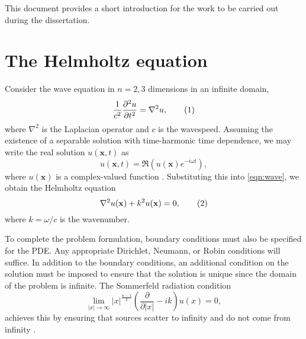 \iffalse Brief outline of the chapter below

Background:
	What is HH equation?
	What does it model?
	How is it derived?
	Boundary conditions
	- 	Sommerfield radiation condition
	
Finite element method:
	Discretisation of HH
	Discretisation of infinite domains
		D,N,radiation
	ABC, DtN, PML

Linear solvers:
	Iterative and direct
	Krylov methods
	Preconditioners
	How does this relate to Poisson and HH?
	- 	Small wavenumbers good convergence

Project direction:
	Where are we going? What to do...?
	Multigrid in non-cartesian coordinates
	Fourier decompostion of HH
	Explore implementation of PMLs
\fi


This document provides a short introduction for the work to be carried out during the dissertation.

\section{The Helmholtz equation}

Consider the wave equation in $n=2,3$ dimensions in an infinite domain,
\[
	\frac{1}{c^2} \frac{\partial^2 u}{\partial t^2} = 
		\nabla^2 u,\addtag \label{eqn:wave}
\]
where $\nabla^2$ is the Laplacian operator and $c$ is the wavespeed.
Assuming the existence of a separable solution with time-harmonic time dependence, we may write the real solution $u(\mathbf{x},t)$ as
\[
	u(\mathbf{x},t) = 
		\Re \left( u(\mathbf{x})e^{-i\omega t} \right),
\]
where $u(\mathbf{x})$ is a complex-valued function \citep{oomph_hh}.
Substituting this into \eqref{eqn:wave}, we obtain the Helmholtz equation
\[
	\nabla^2 u(\mathbf{x}) + k^2 u(\mathbf{x}) = 0, \addtag \label{eqn:hh}
\]
where $k=\omega/c$ is the wavenumber.

To complete the problem formulation, boundary conditions must also be specified for the PDE.
Any appropriate Dirichlet, Neumann, or Robin conditions will suffice.
In addition to the boundary conditions, an additional condition on the solution must be imposed to ensure that the solution is unique since the domain of the problem is infinite.
The Sommerfeld radiation condition
\[
\lim_{|x|\rightarrow \infty} |x|^{\frac{n-1}{2}} \left( \frac{\partial}{\partial |x|} - ik \right) u(x) = 0,
\]
achieves this by ensuring that sources scatter to infinity and do not come from infinity \citep{sommerfeld}.




